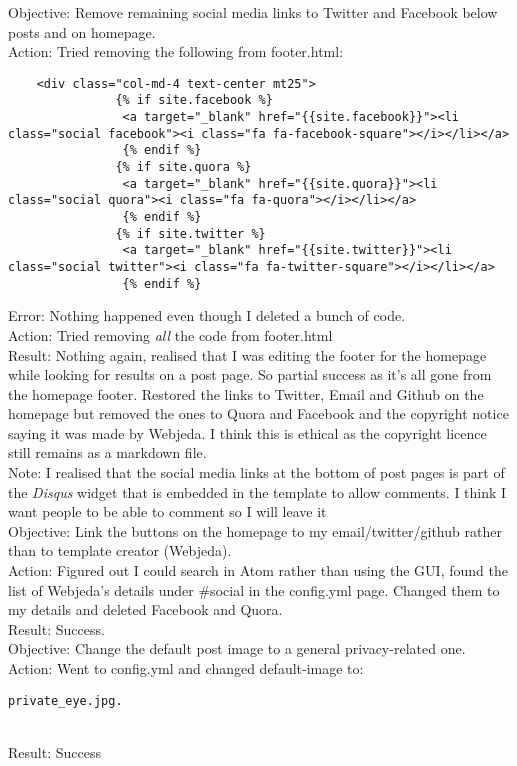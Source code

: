 \documentclass{article}
\begin{document}
Objective: Remove remaining social media links to Twitter and Facebook below posts and on homepage.\\
Action: Tried removing the following from footer.html:
\begin{verbatim}
    <div class="col-md-4 text-center mt25">
               {% if site.facebook %}
                <a target="_blank" href="{{site.facebook}}"><li class="social facebook"><i class="fa fa-facebook-square"></i></li></a> 
                {% endif %}
               {% if site.quora %}
                <a target="_blank" href="{{site.quora}}"><li class="social quora"><i class="fa fa-quora"></i></li></a>
                {% endif %}
               {% if site.twitter %}
                <a target="_blank" href="{{site.twitter}}"><li class="social twitter"><i class="fa fa-twitter-square"></i></li></a>
                {% endif %}
\end{verbatim}
Error: Nothing happened even though I deleted a bunch of code.\\
Action: Tried removing \textit{all} the code from footer.html\\
Result: Nothing again, realised that I was editing the footer for the homepage while looking for results on a post page. So partial success as it's all gone from the homepage footer. Restored the links to Twitter, Email and Github on the homepage but removed the ones to Quora and Facebook and the copyright notice saying it was made by Webjeda. I think this is ethical as the copyright licence still remains as a markdown file.\\

Note: I realised that the social media links at the bottom of post pages is part of the \textit{Disqus} widget that is embedded in the template to allow comments. I think I want people to be able to comment so I will leave it\\

Objective: Link the buttons on the homepage to my email/twitter/github rather than to template creator (Webjeda).\\
Action: Figured out I could search in Atom rather than using the GUI, found the list of Webjeda's details under #social in the config.yml page. Changed them to my details and deleted Facebook and Quora.\\
Result: Success.\\

Objective: Change the default post image to a general privacy-related one.\\
Action: Went to config.yml and changed default-image to: \begin{verbatim}private_eye.jpg.\end{verbatim}\\ 
Result: Success\\
\end{document}
